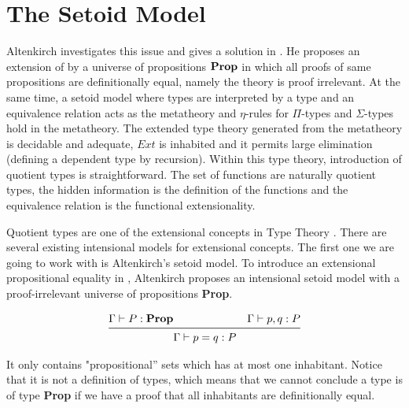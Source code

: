 \chapter{The Setoid Model}
\label{sm}





Altenkirch investigates this issue and gives a solution in
\cite{alti:lics99}. He proposes an extension of \itt by a universe of
propositions $\operatorname{\mathbf{Prop}}$ in which all proofs of same propositions are
definitionally equal, namely the theory is proof irrelevant. At the same time,
a setoid model where types are interpreted by a type and an equivalence relation acts as the metatheory and $\eta$-rules for
$\Pi$-types and $\Sigma$-types hold in the metatheory. The extended type
theory generated from the metatheory is decidable and adequate, $Ext$ is
inhabited and it permits large elimination (defining a dependent type by recursion). Within this type theory,
introduction of quotient types is straightforward. 
The set of functions are naturally quotient types, the hidden information is the
definition of the functions and the equivalence relation is the
functional extensionality.








Quotient types are one of the extensional concepts in Type Theory \cite{hof:phd}. There are several existing intensional models for extensional
concepts. The first one we are going to work with is Altenkirch's
setoid model. To introduce an extensional propositional equality in \itt{}, 
Altenkirch \cite{alti:lics99} proposes an intensional setoid model
with a proof-irrelevant universe of propositions \textbf{Prop}.


\begin{equation}[proof-irr]
\begin{aligned}
\Gamma \vdash P : \textbf{Prop} & & \Gamma \vdash p,q : P & \\
\midrule
& \Gamma \vdash p=q : P & \\
\end{aligned}
\end{equation}

It only contains "propositional'' sets which has at most one
inhabitant. Notice that it is not a definition of types, which means
that we cannot conclude a type is of type \textbf{Prop} if we have a
proof that all
inhabitants are definitionally equal.


